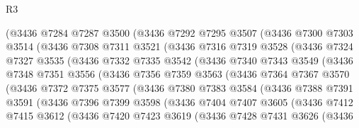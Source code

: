 \begin{lexlean}{R3}
\begin{coremodule}
        (@3436
          @7284
          @7287
          @3500
          (@3436
            @7292
            @7295
            @3507
            (@3436
              @7300
              @7303
              @3514
              (@3436
                @7308
                @7311
                @3521
                (@3436
                  @7316
                  @7319
                  @3528
                  (@3436
                    @7324
                    @7327
                    @3535
                    (@3436
                      @7332
                      @7335
                      @3542
                      (@3436
                        @7340
                        @7343
                        @3549
                        (@3436
                          @7348
                          @7351
                          @3556
                          (@3436
                            @7356
                            @7359
                            @3563
                            (@3436
                              @7364
                              @7367
                              @3570
                              (@3436
                                @7372
                                @7375
                                @3577
                                (@3436
                                  @7380
                                  @7383
                                  @3584
                                  (@3436
                                    @7388
                                    @7391
                                    @3591
                                    (@3436
                                      @7396
                                      @7399
                                      @3598
                                      (@3436
                                        @7404
                                        @7407
                                        @3605
                                        (@3436
                                          @7412
                                          @7415
                                          @3612
                                          (@3436
                                            @7420
                                            @7423
                                            @3619
                                            (@3436
                                              @7428
                                              @7431
                                              @3626
                                              (@3436

\end{coremodule}
\end{lexlean}
